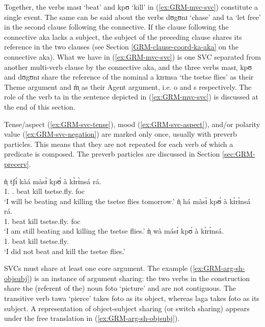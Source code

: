 Together,  the verbs {\sls masɪ} `beat' and  {\sls kpʊ} `kill'  in 
(\ref{ex:GRM-mvc-svc})  constitute a single event.  The same can be said about 
the verbs {\sls dʊgʊnɪ} `chase' and {\sls ta} `let free' in the second clause
following the connective.   If the clause following the connective   {\sls aka}
lacks a subject,  the subject of the preceding clause shares its reference in
the two clauses   (see Section \ref{GRM-clause-coord-ka-aka} on the connective 
{\sls aka}). What we have in (\ref{ex:GRM-mvc-svc}) is one SVC separated from
another multi-verb clause by the connective {\sls aka},  and the three verbs 
{\sls 
masɪ},  {\sls kpʊ} and {\sls dʊgʊnɪ}  share the reference of the  nominal {\sls 
a
kɪrɪnsa} `the tsetse flies' as their Theme argument and {\sls m̩̀} as their 
Agent
argument, i.e. {\sc o} and {\sc s} respectively. The role of  the verb {\sls ta}
in the sentence depicted in  (\ref{ex:GRM-mvc-svc}) is discussed at the end of
this section.

Tense/aspect (\ref{ex:GRM-svc-tense}), mood (\ref{ex:GRM-svc-aspect}), and/or
polarity value (\ref{ex:GRM-svc-negation}) are marked only once, usually with
preverb particles. This means that they are not repeated for each verb of which
a predicate is composed. The preverb particles are discussed in Section
\ref{sec:GRM-precerv}.


\ea\label{ex:GRM-svc-preverb}
 \ea\label{ex:GRM-svc-tense}{
\gll  ǹ̩ tʃɪ́ kàá màsɪ̀   kpʊ́   à  kɪ̀rɪ̀nsá rá.\\
{1.\sg} {\cras} {\fut.\prog}   beat   kill {\art} tsetse.fly.{\pl} {\sc foc} 
\\ 
\glt `I will be beating and killing the tsetse flies tomorrow.'
}
 \ex\label{ex:GRM-svc-aspect}{
\gll  ǹ̩  há màsɪ̀   kpʊ́   à  kɪ̀rɪ̀nsá rá.\\
  {1.\sg}  {\mod}   beat   kill {\art} tsetse.fly.{\pl} {\sc foc}\\ 
 \glt `I am still beating  and killing the tsetse flies.'
 }
 \ex\label{ex:GRM-svc-negation}{
\gll  ǹ̩   wà másɪ́   kpʊ́   à  kɪ̀rɪ̀nsá.\\
  {1.\sg}  {\neg}   beat   kill {\art} tsetse.fly.{\pl}\\
\glt `I did not beat and kill the tsetse flies.'
 }

\z 
 \z

SVCs must share at least one core  argument. The example 
(\ref{ex:GRM-arg-sh-objsubj}) is an instance of argument sharing: the two verbs
in the construction share the (referent of the) noun {\sls foto} `picture' and
are not contiguous. The
transitive verb {\sls tawa} `pierce' takes  {\sls foto} as its object, whereas 
{\sls laga} takes  {\sls foto} as its subject. A representation of 
object-subject
sharing (or switch sharing) appears under the free translation in
(\ref{ex:GRM-arg-sh-objsubj}).

